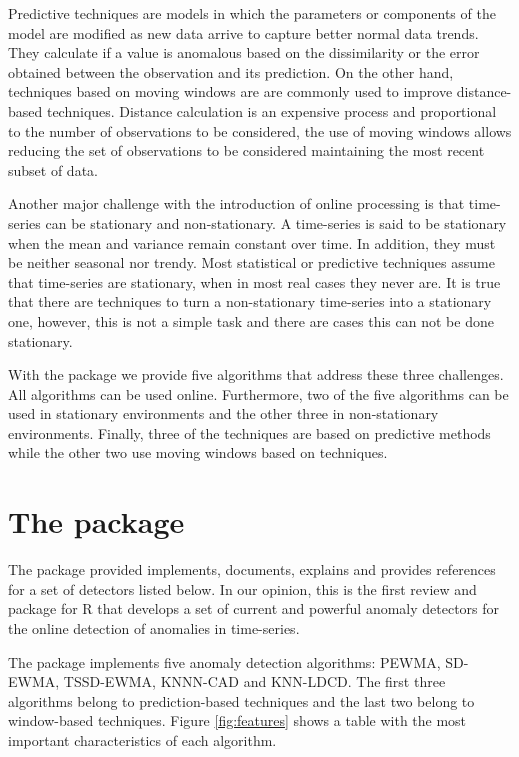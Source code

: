 \documentclass[a4paper]{article}\usepackage[]{graphicx}\usepackage[]{color}
\begin{document}
Predictive techniques are models in which the parameters or components of the model are modified as new data arrive to capture better normal data trends. They calculate if a value is anomalous based on the dissimilarity or the error obtained between the observation and its prediction. On the other hand, techniques based on moving windows are are commonly used to improve distance-based techniques. Distance calculation is an expensive process and proportional to the number of observations to be considered, the use of moving windows allows reducing the set of observations to be considered maintaining the most recent subset of data.

Another major challenge with the introduction of online processing is that time-series can be stationary and non-stationary. A time-series is said to be stationary when the mean and variance remain constant over time. In addition, they must be neither seasonal nor trendy. Most statistical or predictive techniques assume that time-series are stationary, when in most real cases they never are. It is true that there are techniques to turn a non-stationary time-series into a stationary one, however, this is not a simple task and there are cases this can not be done stationary.

With the  package we provide five algorithms that address these three challenges. All algorithms can be used online. Furthermore, two of the five algorithms can be used in stationary environments and the other three in non-stationary environments. Finally, three of the techniques are based on predictive methods while the other two use moving windows based on techniques.

\section{The  package}\label{sec:package}

The package provided implements, documents, explains and provides references for a set of detectors listed below. In our opinion, this is the first review and package for R that develops a set of current and powerful anomaly detectors for the online detection of anomalies in time-series.

The  package implements five anomaly detection algorithms: PEWMA, SD-EWMA, TSSD-EWMA, KNNN-CAD and KNN-LDCD. The first three algorithms belong to prediction-based techniques and the last two belong to window-based techniques. Figure \ref{fig:features} shows a table with the most important characteristics of each algorithm.
\end{document}
